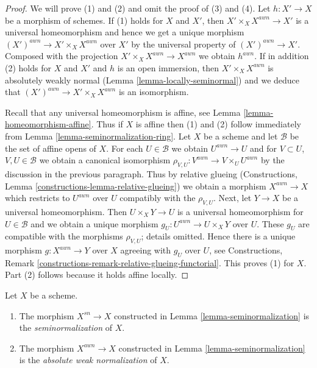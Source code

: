 \begin{proof}
We will prove (1) and (2) and omit the proof of (3) and (4).
Let $h : X' \to X$ be a morphism of schemes. If (1) holds for $X$
and $X'$, then $X' \times_X X^{awn} \to X'$ is a universal homeomorphism
and hence we get a unique morphism $(X')^{awn} \to X' \times_X X^{awn}$
over $X'$ by the universal property of $(X')^{awn} \to X'$. Composed with the
projection $X' \times_X X^{awn} \to X^{awn}$ we obtain $h^{awn}$.
If in addition (2) holds for $X$ and $X'$ and $h$ is an open immersion, then
$X' \times_X X^{awn}$ is absolutely weakly normal
(Lemma \ref{lemma-locally-seminormal}) and we deduce that
$(X')^{awn} \to X' \times_X X^{awn}$ is an isomorphism.

\medskip\noindent
Recall that any universal homeomorphism is affine, see
Lemma \ref{lemma-homeomorphism-affine}. Thus if $X$ is affine
then (1) and (2) follow immediately from
Lemma \ref{lemma-seminormalization-ring}.
Let $X$ be a scheme and let $\mathcal{B}$ be the set of affine opens
of $X$. For each $U \in \mathcal{B}$ we obtain $U^{awn} \to U$
and for $V \subset U$, $V, U \in \mathcal{B}$ we obtain a canonical
isomorphism $\rho_{V, U} : V^{awn} \to V \times_U U^{awn}$ by the discussion
in the previous paragraph. Thus by relative glueing
(Constructions, Lemma \ref{constructions-lemma-relative-glueing})
we obtain a morphism $X^{awn} \to X$ which restricts
to $U^{awn}$ over $U$ compatibly with the $\rho_{V, U}$.
Next, let $Y \to X$ be a universal homeomorphism.
Then $U \times_X Y \to U$ is a universal homeomorphism for $U \in \mathcal{B}$
and we obtain a unique morphism $g_U : U^{awn} \to U \times_X Y$ over $U$.
These $g_U$ are compatible with the morphisms $\rho_{V, U}$; details
omitted. Hence there is a unique morphism $g : X^{awn} \to Y$
over $X$ agreeing with $g_U$ over $U$, see
Constructions, Remark \ref{constructions-remark-relative-glueing-functorial}.
This proves (1) for $X$. Part (2) follows because it holds affine locally.
\end{proof}

\begin{definition}
\label{definition-seminormalization}
Let $X$ be a scheme.
\begin{enumerate}
\item The morphism $X^{sn} \to X$ constructed in
Lemma \ref{lemma-seminormalization}
is the {\it seminormalization} of $X$.
\item The morphism $X^{awn} \to X$ constructed in
Lemma \ref{lemma-seminormalization}
is the {\it absolute weak normalization} of $X$.
\end{enumerate}
\end{definition}

